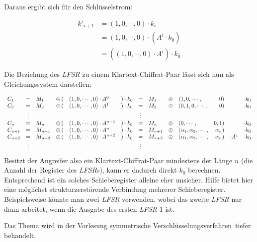 Daraus ergibt sich für den Schlüsselstrom:

\begin{align*}
k'_{i+1}  & =  (1,0,\cdots,0) \cdot k_i \\ & = (1,0,\cdots,0) \cdot (A^i \cdot k_0) \\ & = ((1,0,\cdots,0) \cdot A^i) \cdot k_0
\end{align*}

Die Beziehung des \emph{LFSR} zu einem Klartext-Chiffrat-Paar lässt sich nun als Gleichungssystem darstellen:


\begin{equation*}
	\begin{array}{lcllllclllrlll}
	C_1 &=& M_1 & \oplus \, ( & (1,0,\cdots,0) \cdot A^0 &)\cdot k_0 & = & M_1 & \oplus &(1,0,\cdots, & 0) &&\cdot k_0\\
	C_2 &=& M_2 & \oplus \, ( & (1,0,\cdots,0) \cdot A^1 &)\cdot k_0 & = & M_2 & \oplus &(0,1,0,\cdots, & 0) &&\cdot k_0\\
	&\vdots &&&&&\vdots &&&&&&\\
	C_{n} &=& M_{n} & \oplus \, ( & (1,0,\cdots,0) \cdot A^{n - 1} &) \cdot k_0 & = & M_{n} & \oplus & (0,\cdots, &0, 1) && \cdot k_0 \\
	C_{n+1} & = & M_{n+1} & \oplus \, ( & (1,0,\cdots,0) \cdot A^n & )\cdot k_0 & = & M_{n+1} & \oplus & (\alpha_1,\alpha_2,\cdots, & \alpha_n) && \cdot k_0 \\
	C_{n + 2} & = & M_{n + 2} & \oplus \, ( & (1,0,\cdots,0) \cdot A^{n + 2} & ) \cdot k_0 & = & M_{n + 2} & \oplus & (\alpha_1,\alpha_2,\cdots, &\alpha_n) &\cdot A^1 & \cdot k_0 \\
	&\vdots &&&&&\vdots &&&&\\
	\end{array}
\end{equation*}
Besitzt der Angreifer also ein Klartext-Chiffrat-Paar mindestens der Länge $n$ (die Anzahl der Register des \emph{LFSR}s), kann er dadurch direkt $k_0$
berechnen. Entsprechend ist ein solches Schieberegister alleine eher unsicher. Hilfe bietet hier eine möglichst strukturzerstörende Verbindung mehrerer
Schieberegister. Beispielsweise könnte man zwei \emph{LFSR} verwenden, wobei das zweite \emph{LFSR} nur dann arbeitet, wenn die Ausgabe des ersten \emph{LFSR}
1 ist.

Das Thema wird in der Vorlesung \glqq symmetrische Verschlüsselungsverfahren\grqq\ tiefer behandelt.

